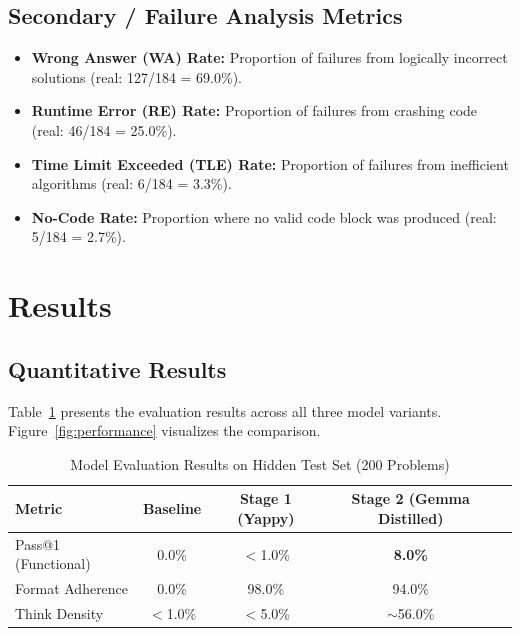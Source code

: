 \documentclass[preprint,12pt]{elsarticle}
\begin{document}
\subsection{Secondary / Failure Analysis Metrics}

\begin{itemize}
    \item \textbf{Wrong Answer (WA) Rate:} Proportion of failures from logically incorrect solutions (real: 127/184 = 69.0\%).
    \item \textbf{Runtime Error (RE) Rate:} Proportion of failures from crashing code (real: 46/184 = 25.0\%).
    \item \textbf{Time Limit Exceeded (TLE) Rate:} Proportion of failures from inefficient algorithms (real: 6/184 = 3.3\%).
    \item \textbf{No-Code Rate:} Proportion where no valid code block was produced (real: 5/184 = 2.7\%).
\end{itemize}

\section{Results}
\label{sec:results}

\subsection{Quantitative Results}

Table~\ref{tab:results} presents the evaluation results across all three model variants. Figure~\ref{fig:performance} visualizes the comparison.

\begin{table}[H]
    \centering
    \caption{Model Evaluation Results on Hidden Test Set (200 Problems)}
    \label{tab:results}
    \begin{tabular}{lcccc}
        \toprule
        \textbf{Metric}     & \textbf{Baseline} & \textbf{Stage 1 (Yappy)} & \textbf{Stage 2 (Gemma Distilled)} \\
        \midrule
        Pass@1 (Functional) & 0.0\%             & $<$1.0\%                 & \textbf{8.0\%}                     \\
        Format Adherence    & 0.0\%             & 98.0\%                   & 94.0\%                             \\
        Think Density       & $<$1.0\%          & $<$5.0\%                 & $\sim$56.0\%                       \\
        \bottomrule
    \end{tabular}
\end{table}
\end{document}
